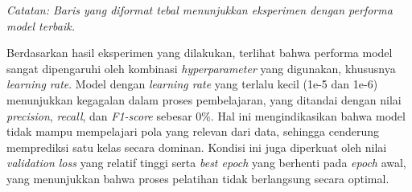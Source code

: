 \begin{table}[H]
    \centering
    \caption{Hasil Eksperimen Model Unimodal Gambar}
    \label{table:4.gambar_eksperimen}
    \scriptsize
    \setlength{\tabcolsep}{2pt} 
    \renewcommand{\arraystretch}{1.1}
    
    \smallskip
    \begin{flushleft}
    \footnotesize \textit{Catatan: Baris yang diformat tebal menunjukkan eksperimen dengan performa model terbaik.}
    \end{flushleft}
\end{table}


Berdasarkan hasil eksperimen yang dilakukan, terlihat bahwa performa model sangat dipengaruhi oleh kombinasi \textit{hyperparameter} yang digunakan, khususnya \textit{learning rate}. Model dengan \textit{learning rate} yang terlalu kecil (1e-5 dan 1e-6) menunjukkan kegagalan dalam proses pembelajaran, yang ditandai dengan nilai \textit{precision}, \textit{recall}, dan \textit{F1-score} sebesar 0\%. Hal ini mengindikasikan bahwa model tidak mampu mempelajari pola yang relevan dari data, sehingga cenderung memprediksi satu kelas secara dominan. Kondisi ini juga diperkuat oleh nilai \textit{validation loss} yang relatif tinggi serta \textit{best epoch} yang berhenti pada \textit{epoch} awal, yang menunjukkan bahwa proses pelatihan tidak berlangsung secara optimal.

